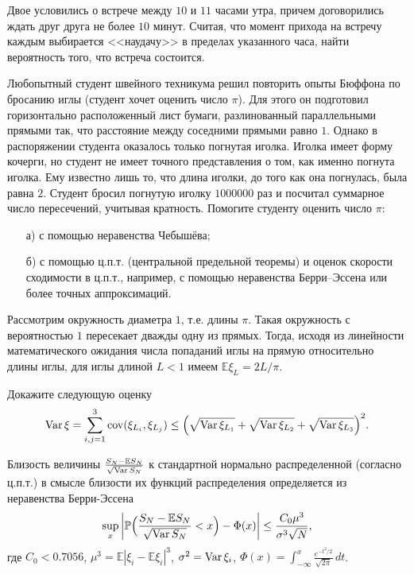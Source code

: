 \begin{problem}
Двое условились о встрече между $10$ и $11$ часами утра, причем договорились ждать друг друга не более $10$ минут. Считая, что 
момент прихода на встречу каждым выбирается <<наудачу>> в пределах указанного часа, найти вероятность того, что встреча состоится. 
\end{problem}


\begin{problem}
Любопытный студент швейного техникума решил повторить опыты Бюффона по бросанию иглы (студент хочет оценить число $\pi$). 
Для этого он подготовил горизонтально расположенный лист бумаги, разлинованный параллельными прямыми так, что расстояние между 
соседними прямыми равно $1$. Однако в распоряжении студента оказалось только погнутая иголка. Иголка имеет форму кочерги, 
но студент не имеет точного представления о том, как именно погнута иголка. Ему известно лишь то, что длина иголки, до того как 
она погнулась, была равна $2$. Студент бросил погнутую иголку $1 000 000$ раз и посчитал суммарное число пересечений, учитывая кратность. 
Помогите студенту оценить число $\pi$: 
\begin{enumerate}
\item[а)] с помощью неравенства Чебышёва; 
\item[б)] с помощью ц.п.т. (центральной предельной теоремы) и оценок скорости сходимости в ц.п.т., например, 
с помощью неравенства Берри–Эссена или более точных аппроксимаций. 
\end{enumerate}
\end{problem}

\begin{ordre}

Рассмотрим окружность диаметра $1$, т.е. длины $\pi$. Такая окружность с вероятностью $1$ пересекает дважды одну из прямых. 
Тогда, исходя из линейности математического ожидания числа попаданий иглы на прямую относительно длины иглы, для иглы длиной $L<1$ 
имеем ${\mathbb E}\xi_L = 2L/\pi$. 

Докажите следующую оценку 
$$
\mathop{\mathrm{Var}}\nolimits \xi =\sum\limits_{i,j=1}^3 \mathrm{cov}(\xi_{L_i}, \xi_{L_j})\le \Bigl( \sqrt{\mathop{\mathrm{Var}}\nolimits \xi_{L_1}}+\sqrt{\mathop{\mathrm{Var}}\nolimits \xi_{L_2}}+
\sqrt{\mathop{\mathrm{Var}}\nolimits \xi_{L_3}} \Bigr)^2 . 
$$


Близость величины $\frac{S_N-{\mathbb E}S_N}{\sqrt{\mathop{\mathrm{Var}}\nolimits S_N}}$ к стандартной нормально распределенной (согласно ц.п.т.) в смысле 
близости их функций распределения определяется из неравенства Берри-Эссена 
$$
\sup\limits_x \left| {\mathbb P}\Bigl( \frac{S_N-{\mathbb E}S_N}{\sqrt{\mathop{\mathrm{Var}}\nolimits S_N}} <x \Bigr) - \Phi(x) 
\right| \le \frac{C_0 \mu^3}{\sigma^3 \sqrt{N}} , 
$$
где $C_0<0.7056$, $\mu^3={\mathbb E}|\xi_i - {\mathbb E}\xi_i|^3$, $\sigma^2=\mathop{\mathrm{Var}}\nolimits \xi_i$, 
$\Phi(x)=\int_{-\infty}^x \frac{e^{-t^2/2}}{\sqrt{2\pi}}\, dt$. 

\end{ordre}



